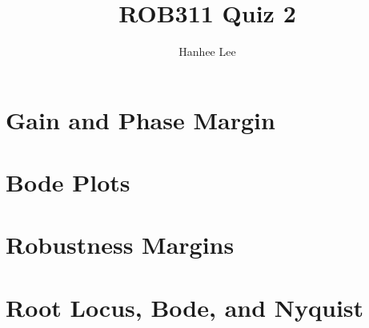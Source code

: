 \documentclass{article}
\title{ROB311 Quiz 2}
\author{Hanhee Lee}
\begin{document}
\maketitle

\tableofcontents
\newpage

\section{Gain and Phase Margin}

\newpage

\section{Bode Plots}

\newpage

\section{Robustness Margins}

\newpage

\section{Root Locus, Bode, and Nyquist}

\newpage
\end{document}
